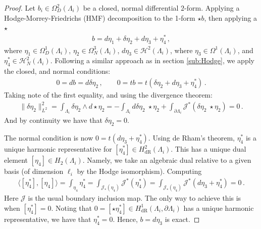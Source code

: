 \documentclass[11pt]{article}
\theoremstyle{plain}
\theoremstyle{definition}
\theoremstyle{remark}
\newcommand{\ST}{\Lambda}
\begin{document}
\begin{proof}
    Let \(b_i \in \Omega^2_D( \ST_i )\) be a closed, normal differential \(2\)-form. Applying a Hodge-Morrey-Friedrichs (HMF) decomposition to the 1-form \(\star b\), then applying a \(\star\)
    \begin{align*}
        b = d \eta_1 + \delta \eta_2 + d \eta_3 + \eta_4^* \, , 
    \end{align*}
    where \(\eta_1 \in \Omega^1 _D (\ST_i)\), \(\eta_2 \in  \Omega^3_N (\ST_i)\), \( d \eta_3 \in \mathcal{H}^2 (\ST_i) \), where \(\eta_3 \in \Omega^1  (\ST_i)\), and \(\eta_4^* \in \mathcal{H}_N^2 (\ST_i) \). Following a similar approach as in section \ref{sub:Hodge}, we apply the closed, and normal conditions:
    \begin{align*}
        0 = db = d   \delta \eta_2  \, , \qquad 0 = tb =  t (  \delta \eta_2 + d \eta_3 + \eta_4^* ) \, .
    \end{align*}
    Taking note of the first equality, and using the divergence theorem:
    \begin{align*}
        \|  \delta \eta_2 \|_{L^2}^2 = \int_{\ST_i}  \delta \eta_2 \wedge  d \star \eta_2 = -\int_{\ST_i} d \delta \eta_2 \; \star \eta_2 + \int_{\partial \ST_i} \mathcal{J}^* (\delta \eta_2 \; \star \eta_2) = 0 \, . 
    \end{align*}
    And by continuity we have that \(\delta \eta_2 = 0\). 

    
    The normal condition is now \( 0 =  t ( d \eta_3 + \eta_4^* ) \). Using de Rham's theorem, \(\eta_4^*\) is a unique harmonic representative for \([\eta_4^*] \in H^2_{\mathrm{dR}} (\ST_i) \). This has a unique dual element \([\eta_4] \in H_2 (\ST_i)\). Namely, we take an algebraic dual relative to a given basis (of dimension \(\ell_i\) by the Hodge isomorphism). Computing
    \begin{align*}
        \langle [ \eta_4^* ], [ \eta_4 ] \rangle = \int_{ \eta_4 } \eta_4^* 
        = \int_{ \mathcal{J}_* (\eta_4 ) } \mathcal{J}^* ( \eta_4^* )
        = \int_{\mathcal{J}_* (\eta_4 )} \mathcal{J}^* (d \eta_3 + \eta_4^* )   = 0 \, . 
    \end{align*}
    Here \(\mathcal{J}\) is the usual boundary inclusion map. The only way to achieve this is when \([\eta_4^*]=0\). Noting that \(0 = [\star \eta_4^*] \in H^1_{\mathrm{dR}} (\ST_i, \partial \ST_i) \) has a unique harmonic representative, we have that \(\eta_4^* = 0\). Hence, \(b = d \eta_3\) is exact.
\end{proof}
\end{document}
